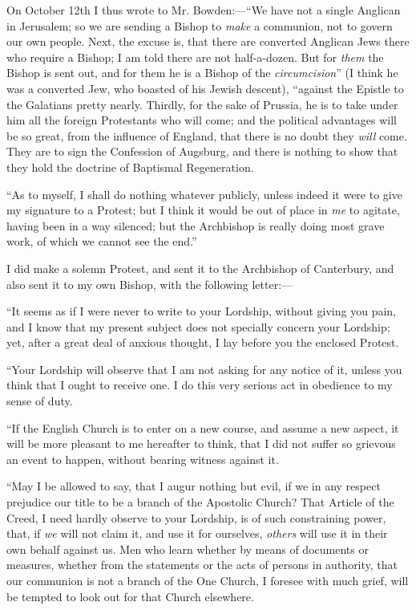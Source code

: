 On October 12th I thus wrote to Mr. Bowden:—``We have
not a single Anglican in Jerusalem; so we are sending a Bishop to \emph{make}
a communion, not to govern our own people. Next, the excuse is,
that there are converted Anglican Jews there who require a Bishop; I am
told there are not half-a-dozen. But for \emph{them} the Bishop is sent
out, and for them he is a Bishop of the \emph{circumcision}'' (I
think he was a converted Jew, who boasted of his Jewish descent),
``against the Epistle to the Galatians pretty nearly. Thirdly, for
the sake of Prussia, he is to take under him all the foreign Protestants
who will come; and the political advantages will be so great, from the
influence of England, that there is no doubt they \emph{will} come. They are to
sign the Confession of Augsburg, and there is nothing to show that they
hold the doctrine of Baptismal Regeneration.

``As to myself, I shall do nothing whatever publicly, unless
indeed it were to give my signature to a Protest; but I think it would
be out of place in \emph{me} to agitate, having been in a way silenced; but the
Archbishop is really doing most grave work, of which we cannot see the
end.''

I did make a solemn Protest, and sent it to the Archbishop of
Canterbury, and also sent it to my own Bishop, with the following
letter:—

``It seems as if I were never to write to your Lordship, without
giving you pain, and I know that my present subject does not specially
concern your Lordship; yet, after a great deal of anxious thought, I lay
before you the enclosed Protest.

``Your Lordship will observe that I am not asking for any notice
of it, unless you think that I ought to receive one. I do this very
serious act in obedience to my sense of duty.

``If the English
Church is to enter on a new course, and assume a new aspect, it will be
more pleasant to me hereafter to think, that I did not suffer so
grievous an event to happen, without bearing witness against it.

``May I be allowed to say, that I augur nothing but evil, if we
in any respect prejudice our title to be a branch of the Apostolic
Church? That Article of the Creed, I need hardly observe to your
Lordship, is of such constraining power, that, if \emph{we} will not
claim it, and use it for ourselves, \emph{others} will use it in their
own behalf against us. Men who learn whether by means of documents or
measures, whether from the statements or the acts of persons in
authority, that our communion is not a branch of the One Church, I foresee with much grief, will be tempted to look out for that
Church elsewhere.

